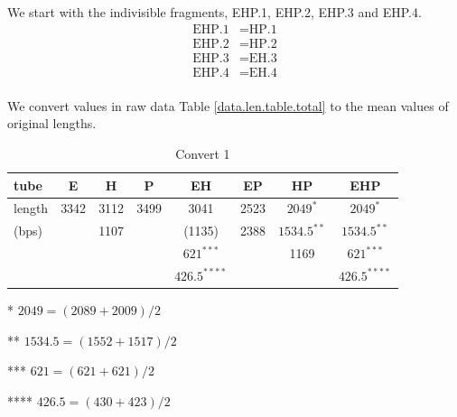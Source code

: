 \documentclass{article}
\begin{document}
            We start with the indivisible fragments, EHP.1, EHP.2, EHP.3 and EHP.4.
            $$\begin{aligned}
            \text{EHP.1} &= \text{HP.1}\\
            \text{EHP.2} &= \text{HP.2}\\
            \text{EHP.3} &= \text{EH.3}\\
            \text{EHP.4} &= \text{EH.4}\\
            \end{aligned}$$

            We convert values in raw data Table \ref{data.len.table.total} to the mean values of original lengths.
            \begin{table}[H]
                \centering
                \caption{Convert 1}
                \begin{threeparttable}
                    \begin{tabular}{|l|c|c|c|c|c|c|c|}
                        \hline
                        tube&E&H&P&EH&EP&HP&EHP\\
                        \hline
                        length&3342&3112&3499&3041&2523&$2049^{*}$&$2049^*$\\
                        (bps)&&1107&&(1135)&2388&$1534.5^{**}$&$1534.5^{**}$\\
                        &&&&$621^{***}$&&1169&$621^{***}$\\
                        &&&&$426.5^{****}$&&&$426.5^{****}$\\
                        \hline
                    \end{tabular}
                    \begin{tablenotes}
                        \footnotesize
                        \item[*] $2049 = (2089 + 2009)/2$
                        \item[**] $1534.5 = (1552 + 1517)/2$
                        \item[***] $621 = (621 + 621)/2$
                        \item[****] $426.5 = (430 + 423)/2$
                    \end{tablenotes}
                \end{threeparttable}
                \label{data.len.table.convert1}
            \end{table}
\end{document}
